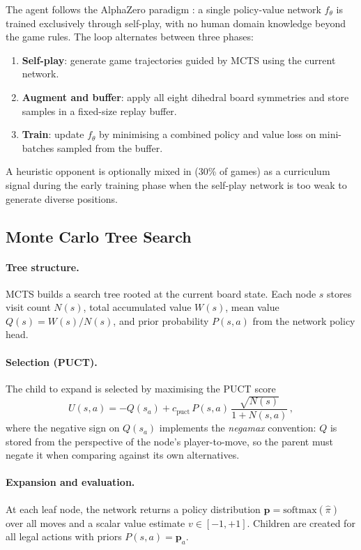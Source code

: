 \documentclass[11pt,a4paper]{article}
\begin{document}
The agent follows the AlphaZero paradigm \citep{silver2018general}: a single
policy-value network $f_\theta$ is trained exclusively through self-play, with no
human domain knowledge beyond the game rules.  The loop alternates between three
phases:
\begin{enumerate}
  \item \textbf{Self-play}: generate game trajectories guided by MCTS using the
        current network.
  \item \textbf{Augment and buffer}: apply all eight dihedral board symmetries
        and store samples in a fixed-size replay buffer.
  \item \textbf{Train}: update $f_\theta$ by minimising a combined policy and
        value loss on mini-batches sampled from the buffer.
\end{enumerate}
A heuristic opponent is optionally mixed in (30\% of games) as a curriculum
signal during the early training phase when the self-play network is too weak to
generate diverse positions.

\subsection{Monte Carlo Tree Search}

\paragraph{Tree structure.}
MCTS builds a search tree rooted at the current board state.  Each node $s$
stores visit count $N(s)$, total accumulated value $W(s)$, mean value
$Q(s) = W(s)/N(s)$, and prior probability $P(s,a)$ from the network policy
head.

\paragraph{Selection (PUCT).}
The child to expand is selected by maximising the PUCT \citep{rosin2011,
silver2016} score
\begin{equation}
  \label{eq:puct}
  U(s,a) = -Q(s_a) + c_\text{puct}\,P(s,a)\,
            \frac{\sqrt{N(s)}}{1 + N(s,a)}\,,
\end{equation}
where the negative sign on $Q(s_a)$ implements the \emph{negamax} convention:
$Q$ is stored from the perspective of the node's player-to-move, so the parent
must negate it when comparing against its own alternatives.

\paragraph{Expansion and evaluation.}
At each leaf node, the network returns a policy distribution
$\mathbf{p} = \mathrm{softmax}(\hat{\pi})$ over all moves and a scalar value
estimate $v \in [-1,+1]$.  Children are created for all legal actions with
priors $P(s,a) = \mathbf{p}_a$.
\end{document}
